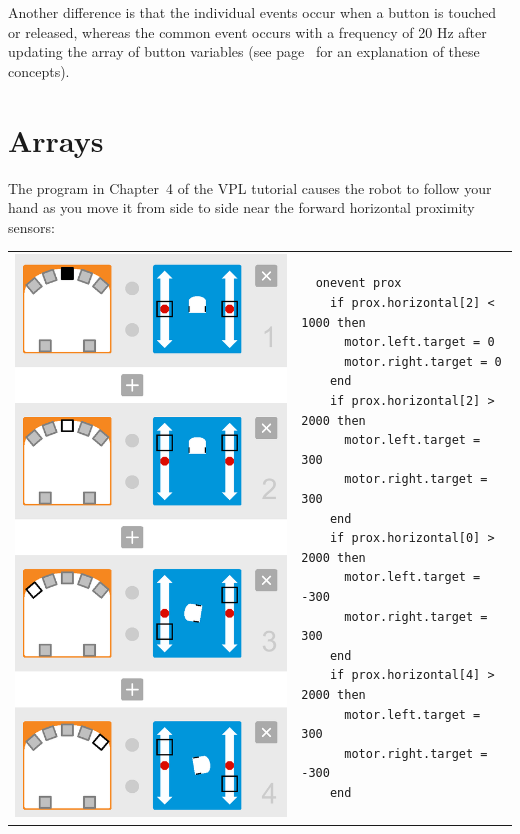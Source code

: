 \documentclass[11pt,a4paper,english]{report}
\begin{document}
Another difference is that the individual events occur when a button is
touched or released, whereas the common event  occurs with a
frequency of 20 Hz after updating the array of button variables (see
page~\pageref{pg.hz} for an explanation of these concepts).


\chapter{Arrays}\label{ch.arrays}

The program  in Chapter~4 of the VPL tutorial causes the
robot to follow your hand as you move it from side to side near the
forward horizontal proximity sensors: 

\begin{center}
\begin{tabular}{ll}
\includegraphics[width=.4\textwidth]{likes} &
\begin{minipage}[b]{.5\textwidth}
\begin{footnotesize}
\begin{verbatim}
  onevent prox
    if prox.horizontal[2] < 1000 then
      motor.left.target = 0
      motor.right.target = 0
    end
    if prox.horizontal[2] > 2000 then
      motor.left.target = 300
      motor.right.target = 300
    end
    if prox.horizontal[0] > 2000 then
      motor.left.target = -300
      motor.right.target = 300
    end
    if prox.horizontal[4] > 2000 then
      motor.left.target = 300
      motor.right.target = -300
    end
\end{verbatim}
\end{footnotesize}
\vspace*{14ex}
\end{minipage}
\end{tabular}
\end{center}
\end{document}
